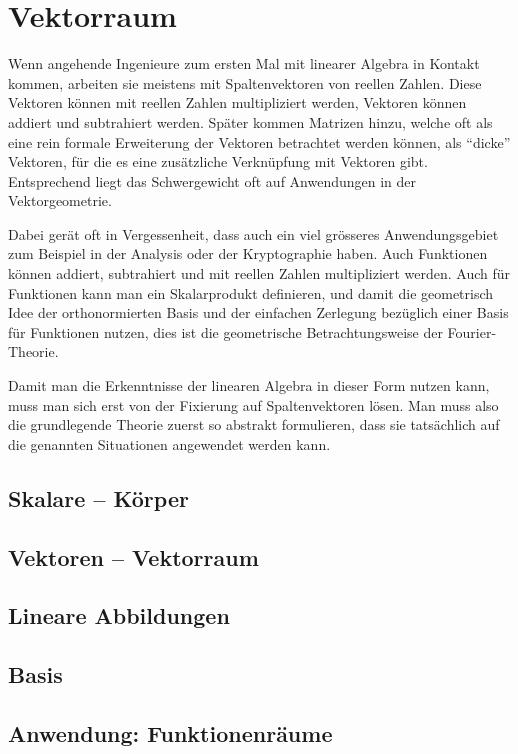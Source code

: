 %
%
%
\chapter{Vektorraum}
Wenn angehende Ingenieure zum ersten Mal mit linearer Algebra in
Kontakt kommen, arbeiten sie meistens mit Spaltenvektoren von
reellen Zahlen.
Diese Vektoren können mit reellen Zahlen multipliziert werden,
Vektoren können addiert und subtrahiert werden.
Später kommen Matrizen hinzu, welche oft als eine rein formale
Erweiterung der Vektoren betrachtet werden können, als ``dicke''
Vektoren, für die es eine zusätzliche Verknüpfung mit Vektoren
gibt.
Entsprechend liegt das Schwergewicht oft auf Anwendungen in der
Vektorgeometrie.

Dabei gerät oft in Vergessenheit, dass auch ein viel grösseres
Anwendungsgebiet zum Beispiel in der Analysis oder der Kryptographie
haben.
Auch Funktionen können addiert, subtrahiert und mit reellen Zahlen
multipliziert werden.
Auch für Funktionen kann man ein Skalarprodukt definieren, und
damit die geometrisch Idee der orthonormierten Basis und der
einfachen Zerlegung bezüglich einer Basis für Funktionen nutzen,
dies ist die geometrische Betrachtungsweise der Fourier-Theorie.

Damit man die Erkenntnisse der linearen Algebra in dieser Form
nutzen kann, muss man sich erst von der Fixierung auf Spaltenvektoren
lösen.
Man muss also die grundlegende Theorie zuerst so abstrakt formulieren,
dass sie tatsächlich auf die genannten Situationen angewendet werden 
kann.


\section{Skalare -- Körper}

\section{Vektoren -- Vektorraum}

\section{Lineare Abbildungen}

\section{Basis}

\section{Anwendung: Funktionenräume}



